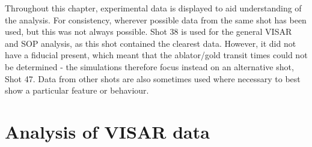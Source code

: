 Throughout this chapter, experimental data is displayed to aid understanding of the analysis. For consistency, wherever possible data from the same shot has been used, but this was not always possible. Shot 38 is used for the general VISAR and SOP analysis, as this shot contained the clearest data. However, it did not have a fiducial present, which meant that the ablator/gold transit times could not be determined - the simulations therefore focus instead on an alternative shot, Shot 47. Data from other shots are also sometimes used where necessary to best show a particular feature or behaviour.


\section{Analysis of VISAR data} \label{VISAR analysis}


